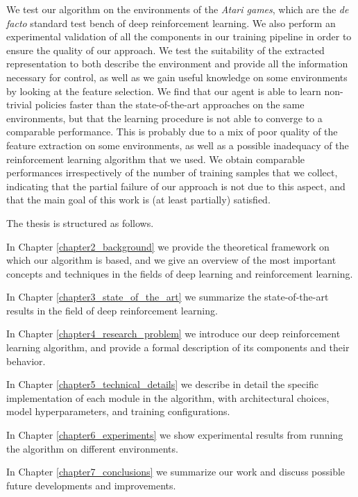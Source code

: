 We test our algorithm on the environments of the \textit{Atari games}, which are
the \textit{de facto} standard test bench of deep reinforcement learning. We 
also perform an experimental validation of all the components in our training 
pipeline in order to ensure the quality of our approach.
We test the suitability of the extracted representation to both describe the 
environment and provide all the information necessary for control, as well as 
we gain useful knowledge on some environments by looking at the feature 
selection.
We find that our agent is able to learn non-trivial policies faster than the
state-of-the-art approaches on the same environments, but that the learning 
procedure is not able to converge to a comparable performance. 
This is probably due to a mix of poor quality of the feature extraction on some 
environments, as well as a possible inadequacy of the reinforcement learning 
algorithm that we used. We obtain comparable performances irrespectively of
the number of training samples that we collect, indicating that the partial
failure of our approach is not due to this aspect, and that the main goal of 
this work is (at least partially) satisfied.

The thesis is structured as follows. 

In Chapter \ref{chapter2_background} we provide the theoretical framework on
which our algorithm is based, and we give an overview of the most important 
concepts and techniques in the fields of deep learning and reinforcement 
learning.

In Chapter \ref{chapter3_state_of_the_art} we summarize the state-of-the-art 
results in the field of deep reinforcement learning.

In Chapter \ref{chapter4_research_problem} we introduce our deep reinforcement 
learning algorithm, and provide a formal description of its components and 
their behavior.

In Chapter \ref{chapter5_technical_details} we describe in detail the specific 
implementation of each module in the algorithm, with architectural choices, 
model hyperparameters, and training configurations.

In Chapter \ref{chapter6_experiments} we show experimental results from running
the algorithm on different environments.

In Chapter \ref{chapter7_conclusions} we summarize our work and discuss possible
future developments and improvements.

